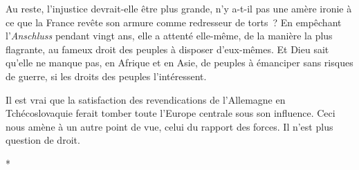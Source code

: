 \documentclass[french,twoside]{book} %
\begin{document}
Au reste, l'injustice devrait-elle être plus grande, n'y a-t-il pas une amère ironie à ce que la France revête son armure comme redresseur de torts ? En empêchant l'{\itshape Anschluss} pendant vingt ans, elle a attenté elle-même, de la manière la plus flagrante, au fameux droit des peuples à disposer d'eux-mê­mes. Et Dieu sait qu'elle ne manque pas, en Afrique et en Asie, de peuples à émanciper sans risques de guerre, si les droits des peuples l'intéressent.\par
Il est vrai que la satisfaction des revendications de l'Allemagne en Tchécoslovaquie ferait tomber toute l'Europe centrale sous son influence. Ceci nous amène à un autre point de vue, celui du rapport des forces. Il n'est plus question de droit.\par
\par

\begin{center}
\noindent \centerline{*}\par
\end{center}
\end{document}
